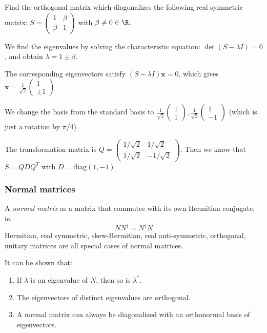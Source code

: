 \documentclass[a4paper]{article}
\begin{document}
  \begin{eg}
    Find the orthogonal matrix which diagonalizes the following real symmetric matrix: $S = 
    \begin{pmatrix}
      1 & \beta\\
      \beta & 1
    \end{pmatrix}$ with $\beta \not= 0 \in \R$.

    We find the eigenvalues by solving the characteristic equation: $\det(S - \lambda I) = 0$, and obtain $\lambda = 1\pm \beta$.

    The corresponding eigenvectors satisfy $(S - \lambda I)\mathbf{x} = 0$, which gives $\displaystyle \mathbf{x} = \frac{1}{\sqrt{2}}
    \begin{pmatrix}
      1\\
      \pm1
    \end{pmatrix}$

    We change the basis from the standard basis to $
    \displaystyle
    \frac{1}{\sqrt{2}}\begin{pmatrix}
      1\\1
    \end{pmatrix},
    \frac{1}{\sqrt{2}}
    \begin{pmatrix}
      1\\-1
    \end{pmatrix}$ (which is just a rotation by $\pi/4$).

    The transformation matrix is $
    Q = \begin{pmatrix}
      1/\sqrt{2} & 1/\sqrt{2}\\
      1/\sqrt{2} & -1/\sqrt{2}
    \end{pmatrix}$. Then we know that $S = QDQ^T$ with $D = \mathrm{diag}(1, -1)$
  \end{eg}
  \subsubsection{Normal matrices}
  \begin{defi}
    A \emph{normal matrix} as a matrix that commutes with its own Hermitian conjugate, ie.
    \[
      NN^\dagger = N^\dagger N
    \]
    Hermitian, real symmetric, skew-Hermitian, real anti-symmetric, orthogonal, unitary matrices are all special cases of normal matrices.  
  \end{defi}

  \begin{prop}
    It can be shown that:
    \begin{enumerate}
      \item If $\lambda$ is an eigenvalue of $N$, then so is $\lambda^*$.
      \item The eigenvectors of distinct eigenvalues are orthogonal.
      \item A normal matrix can always be diagonalized with an orthonormal basis of eigenvectors.
    \end{enumerate}
  \end{prop}
\end{document}
